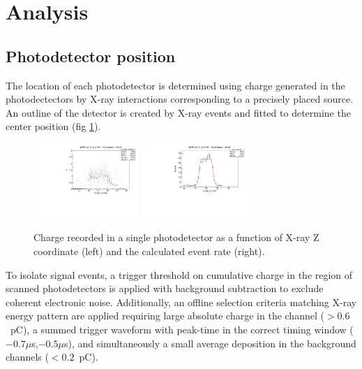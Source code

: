 \section{Analysis}

\subsection{Photodetector position} \label{mppcposition}
The location of each photodetector is determined using charge
generated in the photodectectors by X-ray interactions corresponding
to a precisely placed source.  An outline of the detector is created
by X-ray events and fitted to determine the center position (fig
\ref{fig:xraycharge}). 

\begin{figure}[h]
  \includegraphics[width=4cm]{plots/2018/hcharge67_z}
  \includegraphics[width=4cm]{plots/2018/mppc_fit}
  \caption{Charge recorded in a single photodetector as a function of X-ray Z coordinate 
  (left) and 
    the calculated event rate (right).}
  \label{fig:xraycharge}
\end{figure}  

To isolate signal events, a trigger threshold on cumulative charge 
in the region of scanned photodetectors is applied with background 
subtraction to exclude coherent electronic noise. Additionally, 
an offline selection criteria matching X-ray energy pattern are applied
requiring large absolute charge in the channel 
($>0.6$~pC), a summed trigger waveform with peak-time in the correct timing window ($-0.7\mu$s,$-0.5\mu$s), and simultaneously a small average deposition 
in the background channels ($<0.2$~pC).

